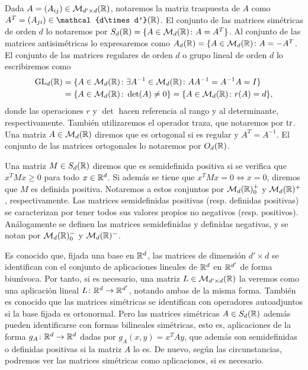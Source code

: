 Dada $A = (A_{ij}) \in \mathcal{M}_{d'\times d}(\mathbb{R})$, notaremos la matriz traspuesta de $A$ como $A^T = (A_{ji}) \in \mathcal{d\times d'}(\R)$. El conjunto de las matrices simétricas de orden $d$ lo notaremos por $S_d(\mathbb{R}) = \{ A \in \mathcal{M}_d(\mathbb{R}) \colon A = A^T\}$. Al conjunto de las matrices antisimétricas lo expresaremos como $A_d(\mathbb{R}) = \{A \in \mathcal{M}_d(\mathbb{R}) \colon A = -A^T$. El conjunto de las matrices regulares de orden $d$ o grupo lineal de orden $d$ lo escribiremos como
\begin{align*}
\operatorname{GL}_d(\mathbb{R}) &= \{A \in \mathcal{M}_d(\mathbb{R}) \colon \exists A^{-1} \in \mathcal{M}_d(\mathbb{R}) \colon AA^{-1} = A^{-1}A = I \}\\
          &= \{A \in \mathcal{M}_d(\mathbb{R}) \colon \det(A) \ne 0\} = \{A \in \mathcal{M}_d(\mathbb{R}) \colon r(A) = d\},
\end{align*}
donde las operaciones $r$ y $\det$ hacen referencia al rango y al determinante, respectivamente. También utilizaremos el operador traza, que notaremos por $\operatorname{tr}$. Una matriz $A \in \mathcal{M}_{d}(\mathbb{R})$ diremos que es ortogonal si es regular y $A^T = A^{-1}$. El conjunto de las matrices ortogonales lo notaremos por $O_d(\mathbb{R})$.

Una matriz $M \in S_d(\mathbb{R})$ diremos que es semidefinida positiva si se verifica que $x^T M x \ge 0$ para todo $x \in \mathbb{R}^d$. Si además se tiene que $x^TMx = 0 \iff x = 0$, diremos que $M$ es definida positiva. Notaremos a estos conjuntos por $\mathcal{M}_d(\mathbb{R})^+_0$ y $\mathcal{M}_d(\mathbb{R})^+$, respectivamente. Las matrices semidefinidas positivas (resp. definidas positivas) se caracterizan por tener todos sus valores propios no negativos (resp. positivos). Análogamente se definen las matrices semidefinidas y definidas negativas, y se notan por $\mathcal{M}_d(\mathbb{R})^-_0$ y $\mathcal{M}_d(\mathbb{R})^-$.

Es conocido que, fijada una base en $\mathbb{R}^d$, las matrices de dimensión $d' \times d$ se identifican con el conjunto de aplicaciones lineales de $\mathbb{R}^d$ en $\mathbb{R}^{d'}$ de forma biunívoca. Por tanto, si es necesario, una matriz $L \in \mathcal{M}_{d'\times d}(\mathbb{R})$ la veremos como una aplicación lineal $L \colon \mathbb{R}^d \to \mathbb{R}^{d'}$, notando ambas de la misma forma. También es conocido que las matrices simétricas se identifican con operadores autoadjuntos si la base fijada es ortonormal. Pero las matrices simétricas $A \in S_d(\mathbb{R})$ además pueden identificarse con formas bilineales simétricas, esto es, aplicaciones de la forma $g_A \colon \mathbb{R}^d \to \mathbb{R}^d$ dadas por $g_A(x,y) = x^TAy$, que además son semidefinidas o definidas positivas si la matriz $A$ lo es. De nuevo, según las circunstancias, podremos ver las matrices simétricas como aplicaciones, si es necesario.

